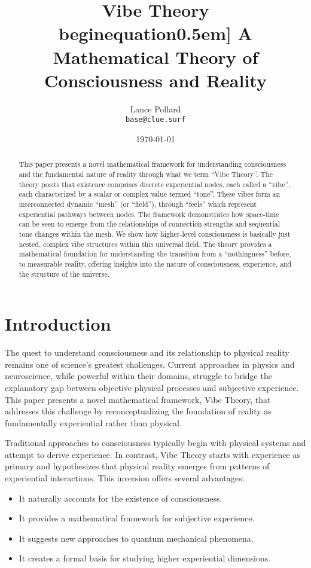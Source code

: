 \documentclass{article}
\title{
  {\huge \textbf{Vibe Theory}} \\begin{equation}0.5em]  %
  \large A Mathematical Theory of Consciousness and Reality
}
\author{Lance Pollard \\ \texttt{base@clue.surf}}
\date{\today}
\date{}
\theoremstyle{definition}
\theoremstyle{axiom}
\theoremstyle{theorem}
\theoremstyle{proposition}
\begin{document}
\maketitle

\begin{abstract}
This paper presents a novel mathematical framework for understanding consciousness and the fundamental nature of reality through what we term \enquote{Vibe Theory}. The theory posits that existence comprises discrete experiential nodes, each called a \enquote{vibe}, each characterized by a scalar or complex value termed \enquote{tone}. These vibes form an interconnected dynamic \enquote{mesh} (or \enquote{field}), through \enquote{feels} which represent experiential pathways between nodes. The framework demonstrates how space-time can be seen to emerge from the relationships of connection strengths and sequential tone changes within the mesh. We show how higher-level consciousness is basically just nested, complex vibe structures within this universal field. The theory provides a mathematical foundation for understanding the transition from a \enquote{nothingness} before, to measurable reality, offering insights into the nature of consciousness, experience, and the structure of the universe.
\end{abstract}
\section{Introduction}

The quest to understand consciousness and its relationship to physical reality remains one of science's greatest challenges. Current approaches in physics and neuroscience, while powerful within their domains, struggle to bridge the explanatory gap between objective physical processes and subjective experience. This paper presents a novel mathematical framework, Vibe Theory, that addresses this challenge by reconceptualizing the foundation of reality as fundamentally experiential rather than physical.

Traditional approaches to consciousness typically begin with physical systems and attempt to derive experience. In contrast, Vibe Theory starts with experience as primary and hypothesizes that physical reality emerges from patterns of experiential interactions. This inversion offers several advantages:

\begin{itemize}
\item It naturally accounts for the existence of consciousness.
\item It provides a mathematical framework for subjective experience.
\item It suggests new approaches to quantum mechanical phenomena.
\item It creates a formal basis for studying higher experiential dimensions.
\end{itemize}
\end{document}
